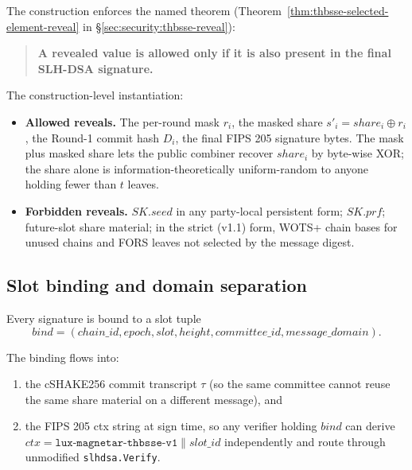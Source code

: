 The construction enforces the named theorem
(Theorem~\ref{thm:thbsse-selected-element-reveal} in
\S\ref{sec:security:thbsse-reveal}):

\begin{quote}
\textbf{A revealed value is allowed only if it is also present in
the final SLH-DSA signature.}
\end{quote}

The construction-level instantiation:

\begin{itemize}[leftmargin=2em,nosep]
  \item \textbf{Allowed reveals.} The per-round mask $r_i$, the
        masked share $s'_i = \mathit{share}_i \oplus r_i$, the
        Round-1 commit hash $D_i$, the final FIPS 205 signature
        bytes. The mask plus masked share lets the public combiner
        recover $\mathit{share}_i$ by byte-wise XOR; the share
        alone is information-theoretically uniform-random to
        anyone holding fewer than $t$ leaves.
  \item \textbf{Forbidden reveals.} $\mathit{SK.seed}$ in any
        party-local persistent form; $\mathit{SK.prf}$;
        future-slot share material; in the strict (v1.1) form,
        WOTS+ chain bases for unused chains and FORS leaves not
        selected by the message digest.
\end{itemize}

\subsection{Slot binding and domain separation}
\label{sec:thbsse:slotbind}

Every signature is bound to a slot tuple
\begin{equation*}
  \mathit{bind} = (\mathit{chain\_id}, \mathit{epoch},
  \mathit{slot}, \mathit{height},
  \mathit{committee\_id}, \mathit{message\_domain}).
\end{equation*}

The binding flows into:

\begin{enumerate}[leftmargin=2em,nosep]
  \item the cSHAKE256 commit transcript $\tau$ (so the same
        committee cannot reuse the same share material on a
        different message), and
  \item the FIPS 205 ctx string at sign time, so any verifier
        holding $\mathit{bind}$ can derive
        $\mathit{ctx} = \texttt{lux-magnetar-thbsse-v1} \|
        \mathit{slot\_id}$ independently and route through
        unmodified \texttt{slhdsa.Verify}.
\end{enumerate}

